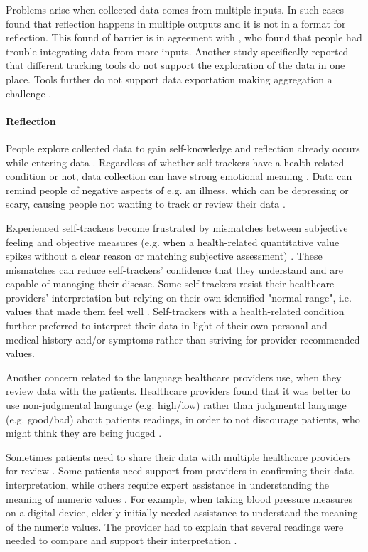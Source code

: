 Problems arise when collected data comes from multiple inputs. In such cases \citep{Li2010} found that reflection happens in multiple outputs and it is not in a format for reflection. This found of barrier is in agreement with \citep{Rooksby2014}, who found that people had trouble integrating data from more inputs. Another study specifically reported that different tracking tools do not support the exploration of the data in one place. Tools further do not support data exportation making aggregation a challenge \citep{Li2011}. 

\paragraph{Reflection}
People explore collected data to gain self-knowledge and reflection already occurs while entering data \citep{Whooley2014, MacLeod2014, Epstein2015}. Regardless of whether self-trackers have a health-related condition or not, data collection can have strong emotional meaning \citep{Li2010, Ancker2015}. Data can remind people of negative aspects of e.g. an illness, which can be depressing or scary, causing people not wanting to track or review their data \citep{Ancker2015}. 

Experienced self-trackers become frustrated by mismatches between subjective feeling and objective measures (e.g. when a health-related quantitative value spikes without a clear reason or matching subjective assessment) \citep{Ancker2015}. These mismatches can reduce self-trackers' confidence that they understand and are capable of managing their disease. Some self-trackers resist their healthcare providers' interpretation but relying on their own identified "normal range", i.e. values that made them feel well \citep{Ancker2015}. Self-trackers with a health-related condition further preferred to interpret their data in light of their own personal and medical history and/or symptoms rather than striving for provider-recommended values. 

Another concern related to the language healthcare providers use, when they review data with the patients. Healthcare providers found that it was better to use non-judgmental language (e.g. high/low) rather than judgmental language (e.g. good/bad) about patients readings, in order to not discourage patients, who might think they are being judged \citep{Ancker2015}. 

Sometimes patients need to share their data with multiple healthcare providers for review \citep{Chung2016}. Some patients need support from providers in confirming their data interpretation, while others require expert assistance in understanding the meaning of numeric values \citep{Verdezoto2015}. For example, when taking blood pressure measures on a digital device, elderly initially needed assistance to understand the meaning of the numeric values. The provider had to explain that several readings were needed to compare and support their interpretation \citep{Verdezoto2015}. 

